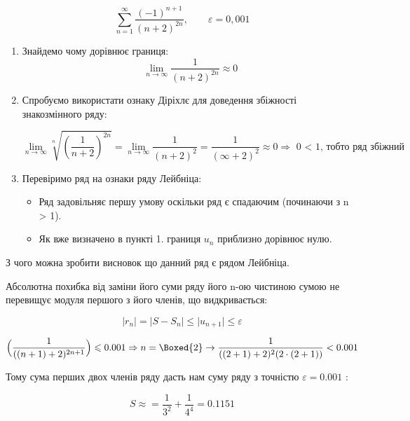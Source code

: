 {}

$$
  \sum_{n=1}^\infty \dfrac{(-1)^{n+1}}{(n+2)^{2n}}, \qquad \varepsilon = 0,001
$$

\begin{enumerate}
  \item  Знайдемо чому дорівнює границя:
         $$ \lim_{n \to \infty } \dfrac{1}{(n+2)^{2n}} \approx 0 $$

 \item Спробуємо використати ознаку Діріхлє для доведення збіжності знакозмінного ряду:

  $$
    \lim_{n \to \infty} \sqrt[n]{(\dfrac{1}{n+2})^{2n}}
  = \lim_{n \to \infty} \dfrac{1}{(n+2)^2}
  = \dfrac{1}{(\infty+2)^2}\approx 0 \Rightarrow {\text{ 0 < 1, тобто ряд збіжний}}
  $$

  \item Перевіримо ряд на ознаки ряду Лейбніца:
    \begin{itemize}
        \item Ряд задовільняє першу умову оскільки ряд є спадаючим (починаючи з n > 1).
        \item Як вже визначено в пункті 1. границя $u_n$ приблизно дорівнює нулю.
      \end{itemize}

\end{enumerate}

З чого можна зробити висновок що данний ряд є рядом Лейбніца.

Абсолютна похибка від заміни його суми ряду його n-ою чистиною сумою не перевищує модуля першого з його членів, що видкривається:

$$
\Big| r_n \Big| = \Big| S-S_n \Big| \leqslant \Big| u_{n+1} \Big| \leqslant \varepsilon
$$


$$\Big( \dfrac{1}{((n+1)+2)^{2n+1}} \Big) \leqslant 0.001 \Rightarrow n = \Boxed{2} \rightarrow \dfrac{1}{((2+1)+2)^2(2\cdot(2+1))} < 0.001 $$

Тому сума перших двох членів ряду дасть нам суму ряду з точністю $\varepsilon = 0.001$ :

$$
  S \approx = \dfrac{1}{3^2} + \dfrac{1}{4^4} = \boxed{0.1151}
$$
